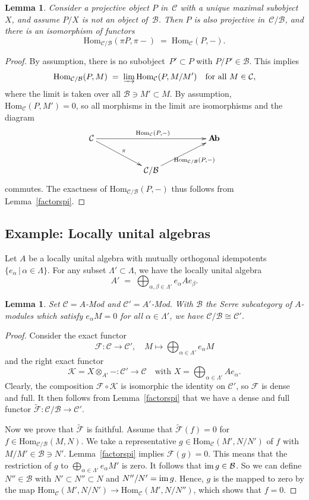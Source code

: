 \documentclass[11pt]{amsart}
\newcommand{\Ffun}{\mathscr{F}}
\newcommand{\Kfun}{\mathscr{K}}
\newcommand{\Ab}{\mathbf{A\hspace{-0.5mm}b}}
\newcommand{\cB}{\mathcal B}
\newcommand{\im}{{\rm{im}\,}}
\newcommand{\Hom}{\mathrm{Hom}}
\newcommand{\cC}{\mathcal{C}}
\numberwithin{equation}{section}
\theoremstyle{plain}
\newtheorem{lemma}[subsubsection]{Lemma}
\theoremstyle{remark}
\theoremstyle{remark}
\theoremstyle{construction}
\begin{document}
\begin{lemma}\label{ProjBC}
Consider a projective object $P$ in~$\cC$ with a unique maximal subobject $X$, and assume $P/X$ is not an object of~$\cB$.
 Then $P$ is also projective in~$\cC/\cB$, and {there is an isomorphism of functors}
$$\Hom_{\cC/\cB}(\pi P,\pi -)\;=\;\Hom_{\cC}(P,-).$$
\end{lemma}
\begin{proof}
By assumption, there is no subobject~$P'\subset P$ with $P/P'\in\cB$. This implies
$$\Hom_{\cC/\cB}(P,M)\;=\;\varinjlim\Hom_{\cC}(P,M/M')\quad \mbox{for all $M\in\cC$,}$$
where the limit is taken over all $\cB\ni M'\subset M$. By assumption, $\Hom_{\cC}(P,M')=0$, so all morphisms in the limit are isomorphisms
and the diagram
$$\xymatrix{
\cC\ar[rrrr]^{\Hom_{\cC}(P,-)}\ar[rrd]^{\pi}&&&&\Ab\\
&&\cC/\cB\ar[rru]_{\Hom_{\cC/\cB}(P,-)}
}$$
commutes. {The exactness of} $\Hom_{\cC/\cB}(P,-)$ thus follows from Lemma~\ref{factorspi}.
\end{proof}


\subsection{Example: Locally unital algebras}

Let $A$ be a locally unital algebra with mutually orthogonal idempotents $\{e_\alpha\,|\,\alpha\in\Lambda\}$. For any subset $\Lambda'\subset \Lambda$, we have the locally unital algebra 
$$A'\;=\;\bigoplus_{\alpha,\beta\in \Lambda'}e_\alpha A e_\beta.$$

\begin{lemma}\label{LemQuoAlg}
Set {\rm $\cC=A$-Mod} and $\cC'=A'${\rm -Mod}.
With
$\cB$ the Serre subcategory of $A$-modules which satisfy $e_\alpha M=0$ for all $\alpha\in\Lambda'$, we have $\cC/\cB\cong \cC'$.
\end{lemma}
\begin{proof}
Consider the exact functor
$${\Ffun}:\cC\to \cC',\quad M\mapsto \bigoplus_{\alpha\in\Lambda'}e_\alpha M$$
and the right exact functor
$${\Kfun}=X\otimes_{A'}-:\cC'\to\cC\quad\mbox{with $X=\bigoplus_{\alpha\in\Lambda'}Ae_\alpha$}. $$
Clearly, the composition ${\Ffun}\circ {\Kfun}$ is isomorphic the identity on $\cC'$, so $\Ffun$ is dense and full. It then follows from Lemma~\ref{factorspi} that we have a dense and full functor $\widetilde{{\Ffun}}:\cC/\cB\to \cC'$. 

Now we prove that $\widetilde{{\Ffun}}$ is faithful. Assume that $\widetilde{{\Ffun}}(f)=0$ for $f\in\Hom_{\cC/\cB}(M,N)$. We take a representative $g\in \Hom_{{\mathcal{C}}}(M',N/N')$ of $f$ with $M/M'\in\cB\ni N'$. Lemma~\ref{factorspi} implies ${\Ffun}(g)=0$. This means that the restriction of $g$ to $\bigoplus_{\alpha\in\Lambda'}e_\alpha M'$ is zero. It follows that $\im g\in\cB$. So we can define $N''\in\cB$ with $N'\subset N''\subset N$ and $N''/N'=\im g$. Hence, {$g$ is the mapped to zero by the map} $\Hom_{\cC}(M',N/N')\to\Hom_{\cC}(M',N/N'')$, which shows that $f=0$.
\end{proof}
\end{document}
